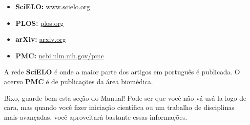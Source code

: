 \begin{itemize}
    \item  \textbf{SciELO:} \url{www.scielo.org}
    \item  \textbf{PLOS:} \url{plos.org}
    \item  \textbf{arXiv:} \url{arxiv.org}
    \item  \textbf{PMC:} \url{ncbi.nlm.nih.gov/pmc}
\end{itemize}

A rede \textbf{SciELO} é onde a maior parte dos artigos em português é
publicada. O acervo \textbf{PMC} é de publicações da área biomédica.

Bixo, guarde bem esta seção do Manual! Pode ser que você não vá usá-la logo de
cara, mas quando você fizer iniciação científica ou um trabalho de disciplinas
mais avançadas, você aproveitará bastante essas informações.
